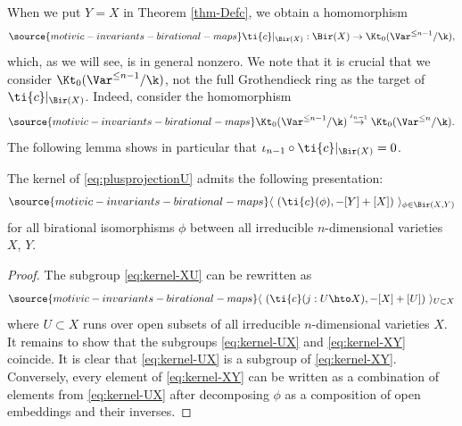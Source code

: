 When we put
$Y = X$ in Theorem
\ref{thm-Defc},
we obtain a homomorphism
\begin{equation}\label{wtc-BirX}
\source{motivic-invariants-birational-maps}
\ti{c}|_{\Bir(X)} : \Bir(X) \to \Kt_0(\Var^{\le{n-1}}/\k),
\end{equation}
which, as we will see,
is in general nonzero.
We note that it is crucial that we consider
$\Kt_0(\Var^{\le n-1}/\k)$, not the full Grothendieck
ring as the target of $\ti{c}|_{\Bir(X)}$.
Indeed, consider the homomorphism
\begin{equation}\label{eq:iota}
\source{motivic-invariants-birational-maps}
\Kt_0(\Var^{\le n-1}/\k) \overset{\iota_{n-1}}\to \Kt_0(\Var^{\le n}/\k).
\end{equation}
The following lemma shows in particular
that $\iota_{n-1} \circ \ti{c}|_{\Bir(X)} = 0$.

\begin{lemma}
\notready\label{lem:kernelXY}
The kernel of \eqref{eq:plusprojectionU}
admits the following presentation:
\begin{equation}\label{eq:kernel-XY}
\source{motivic-invariants-birational-maps}
\langle \ \left( \ti{c}(\phi),
-[Y] + [X] \right) \ \rangle_{\phi \in \Bir(X,Y)}
\end{equation}
for all birational isomorphisms $\phi$
between all irreducible $n$-dimensional
varieties $X$, $Y$.
\end{lemma}
\begin{proof}
The subgroup \eqref{eq:kernel-XU} can be rewritten as
\begin{equation}\label{eq:kernel-UX}
\source{motivic-invariants-birational-maps}
\langle \ \left( \ti{c}(j:U \hto X),
- [X] + [U] \right) \ \rangle_{U \subset X}
\end{equation}
where
$U \subset X$ runs over
open subsets of all irreducible $n$-dimensional
varieties $X$.
It remains to show that the subgroups \eqref{eq:kernel-UX}
and \eqref{eq:kernel-XY} coincide.
It is clear that \eqref{eq:kernel-UX} is a subgroup of
\eqref{eq:kernel-XY}. Conversely, every element of
\eqref{eq:kernel-XY} can be written as a combination
of elements
from \eqref{eq:kernel-UX} after decomposing
$\phi$ as a composition of open embeddings and their inverses.
\end{proof}


